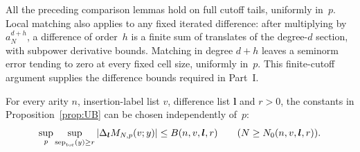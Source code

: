 All the preceding comparison lemmas hold on full cutoff tails, uniformly in~$p$. Local matching also applies to any fixed iterated difference: after multiplying by $a_N^{d+h}$, a difference of order~$h$ is a finite sum of translates of the degree-$d$ section, with subpower derivative bounds. Matching in degree $d+h$ leaves a seminorm error tending to zero at every fixed cell size, uniformly in~$p$. This finite-cutoff argument supplies the difference bounds required in Part~I.
\begin{lemma}\label{lem:E2.4}
For every arity $n$, insertion-label list $v$, difference list $\boldsymbol l$ and $r>0$, the constants in Proposition~\ref{prop:UB} can be chosen independently of~$p$:
\begin{equation*}
\sup_p\sup_{\operatorname{sep}_{\rm tor}(y)\ge r}
|\Delta_{\boldsymbol l}M_{N,p}(v;y)|\le B(n,v,\boldsymbol l,r)
\qquad(N\ge N_0(n,v,\boldsymbol l,r)).
\end{equation*}
\end{lemma}
